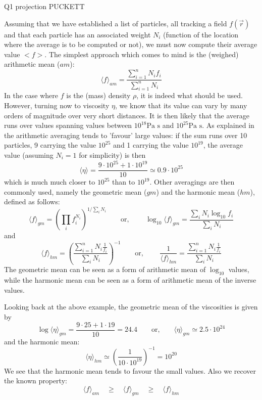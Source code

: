 Q1 projection PUCKETT


Assuming that we have established a list of particles, all tracking a field $f(\vec r)$ and that each particle has an 
associated weight $N_i$ (function of the location where the average is to be computed or not), 
we must now compute their average value $<f>$. 
The simplest approach which comes to mind is the (weighed) arithmetic mean ($am$):
\[
\langle f\rangle_{am} = \frac{\sum\limits_{i=1}^n N_i f_i}{\sum\limits_{i=1}^n N_i}
\]  
In the case where $f$ is the (mass) density $\rho$, it is indeed what should be used. 
However, turning now to viscosity $\eta$, we know that its value can vary by many orders of magnitude 
over very short distances.
It is then likely that the average runs over values spanning values between $10^{18}\text{Pa s}$ and $10^{25} \text{Pa s}$.
As explained in \cite{scbe08} the arithmetic averaging tends to 'favour' large values: if the sum runs over 
10 particles, 9 carrying the value $10^{25}$ and 1 carrying the value $10^{19}$, the average value (assuming $N_i=1$ for simplicity)
is then
\[
\langle\eta\rangle = \frac{9\cdot 10^{25}+1\cdot 10^{19}}{10} \simeq 0.9\cdot 10^{25}
\]
which is much much closer to $10^{25}$ than to $10^{19}$.
Other averagings are then commonly used, namely the geometric mean ($gm$)  and the harmonic mean ($hm$), defined as follows:
\[
\langle f\rangle_{gm} = \left( \prod_i f_i^{N_i} \right)^{1/\sum\limits_i N_i} 
\qquad
\text{or, }
\qquad
\log_{10} \langle f \rangle_{gm} = \frac{\sum_i N_i \log_{10} f_i }{\sum\limits_i N_i}  
\]
and 
\[
\langle f\rangle_{hm} = \left( \frac{\sum_{i=1}^n N_i \frac{1}{f_i} }{\sum_i N_i}  \right)^{-1}
\qquad
\text{or, }
\qquad
\frac{1}{\langle f\rangle_{hm} } = \frac{\sum_{i=1}^n N_i \frac{1}{f_i} }{\sum_i N_i}  
\]
The geometric mean can be seen as a form of arithmetic mean of $\log_{10}$ values, while the harmonic mean can be seen as 
a form of arithmetic mean of the inverse values.

Looking back at the above example, the geometric mean of the viscosities is given by 
\[
\log \langle \eta\rangle_{gm} = \frac{9\cdot 25+1\cdot 19}{10} = 24.4 
\qquad \text{or,} \qquad 
\langle \eta\rangle_{gm} \simeq 2.5 \cdot 10^{24}
\]
and the harmonic mean:
\[
\langle\eta\rangle_{hm} \simeq \left( \frac{1}{10 \cdot  10^{19}} \right)^{-1} = 10^{20}
\]
We see that the harmonic mean tends to favour the small values. Also we recover the known property:
\begin{equation}
\langle f \rangle_{am}\quad  \geq \quad
\langle f \rangle_{gm}\quad  \geq \quad
\langle f \rangle_{hm} 
\end{equation}



